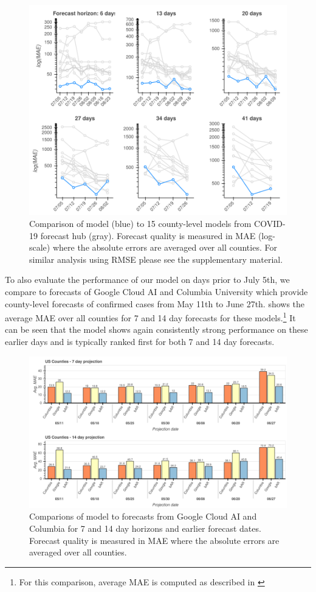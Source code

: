 \begin{figure}[t]
\centering
\includegraphics[width=.75\linewidth]{img/us_mae/us_mae.png}
\caption{\label{fig:mae-covidhub}Comparison of \bAR model (blue) to 15 county-level models from COVID-19 forecast hub (gray). Forecast quality is measured in MAE (log-scale) where the absolute errors are averaged over all counties. For similar analysis using RMSE please see the supplementary material.}
\end{figure}


To also evaluate the performance of our model on days prior to July 5th, we
compare to forecasts of Google Cloud AI \citep{arik2020interpretable} and Columbia
University \citep{forecasts/columbia} which provide county-level forecasts of
confirmed cases from May 11th to June 27th.  shows the average
MAE over all counties for 7 and 14 day forecasts for these models.\footnote{For this
comparison, average MAE is computed as described in \citep{arik2020interpretable}}
It can be seen that the \bAR model shows again consistently strong performance on these
earlier days and is typically ranked first for both 7 and 14 day forecasts.

\begin{figure}[t]
\centering
\includegraphics[width=.9\textwidth]{img/counties_bar_mae.png}
\caption{\label{fig:mae-google}Comparions of \bAR model to forecasts from Google Cloud AI and Columbia for 7 and 14 day horizons and earlier forecast dates. Forecast quality is measured in MAE where the absolute errors are averaged over all counties.}
\end{figure}

